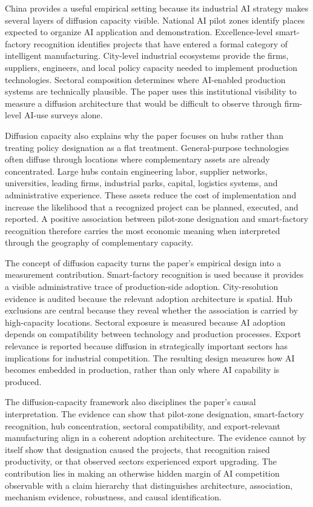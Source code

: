 China provides a useful empirical setting because its industrial AI strategy makes several layers of diffusion capacity visible. National AI pilot zones identify places expected to organize AI application and demonstration. Excellence-level smart-factory recognition identifies projects that have entered a formal category of intelligent manufacturing. City-level industrial ecosystems provide the firms, suppliers, engineers, and local policy capacity needed to implement production technologies. Sectoral composition determines where AI-enabled production systems are technically plausible. The paper uses this institutional visibility to measure a diffusion architecture that would be difficult to observe through firm-level AI-use surveys alone.

Diffusion capacity also explains why the paper focuses on hubs rather than treating policy designation as a flat treatment. General-purpose technologies often diffuse through locations where complementary assets are already concentrated. Large hubs contain engineering labor, supplier networks, universities, leading firms, industrial parks, capital, logistics systems, and administrative experience. These assets reduce the cost of implementation and increase the likelihood that a recognized project can be planned, executed, and reported. A positive association between pilot-zone designation and smart-factory recognition therefore carries the most economic meaning when interpreted through the geography of complementary capacity.

The concept of diffusion capacity turns the paper's empirical design into a measurement contribution. Smart-factory recognition is used because it provides a visible administrative trace of production-side adoption. City-resolution evidence is audited because the relevant adoption architecture is spatial. Hub exclusions are central because they reveal whether the association is carried by high-capacity locations. Sectoral exposure is measured because AI adoption depends on compatibility between technology and production processes. Export relevance is reported because diffusion in strategically important sectors has implications for industrial competition. The resulting design measures how AI becomes embedded in production, rather than only where AI capability is produced.

The diffusion-capacity framework also disciplines the paper's causal interpretation. The evidence can show that pilot-zone designation, smart-factory recognition, hub concentration, sectoral compatibility, and export-relevant manufacturing align in a coherent adoption architecture. The evidence cannot by itself show that designation caused the projects, that recognition raised productivity, or that observed sectors experienced export upgrading. The contribution lies in making an otherwise hidden margin of AI competition observable with a claim hierarchy that distinguishes architecture, association, mechanism evidence, robustness, and causal identification.